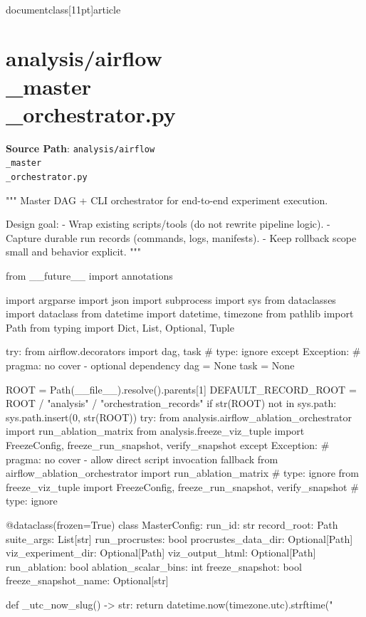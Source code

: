 \\documentclass[11pt]{article}
\begin{document}
\section*{analysis/airflow\\_master\\_orchestrator.py}
\textbf{Source Path}: \texttt{analysis/airflow\\_master\\_orchestrator.py}\par
\bigskip
\begin{CodeBlock}
"""
Master DAG + CLI orchestrator for end-to-end experiment execution.

Design goal:
- Wrap existing scripts/tools (do not rewrite pipeline logic).
- Capture durable run records (commands, logs, manifests).
- Keep rollback scope small and behavior explicit.
"""

from __future__ import annotations

import argparse
import json
import subprocess
import sys
from dataclasses import dataclass
from datetime import datetime, timezone
from pathlib import Path
from typing import Dict, List, Optional, Tuple

try:
    from airflow.decorators import dag, task  # type: ignore
except Exception:  # pragma: no cover - optional dependency
    dag = None
    task = None


ROOT = Path(__file__).resolve().parents[1]
DEFAULT_RECORD_ROOT = ROOT / "analysis" / "orchestration_records"
if str(ROOT) not in sys.path:
    sys.path.insert(0, str(ROOT))
try:
    from analysis.airflow_ablation_orchestrator import run_ablation_matrix
    from analysis.freeze_viz_tuple import FreezeConfig, freeze_run_snapshot, verify_snapshot
except Exception:  # pragma: no cover - allow direct script invocation fallback
    from airflow_ablation_orchestrator import run_ablation_matrix  # type: ignore
    from freeze_viz_tuple import FreezeConfig, freeze_run_snapshot, verify_snapshot  # type: ignore


@dataclass(frozen=True)
class MasterConfig:
    run_id: str
    record_root: Path
    suite_args: List[str]
    run_procrustes: bool
    procrustes_data_dir: Optional[Path]
    viz_experiment_dir: Optional[Path]
    viz_output_html: Optional[Path]
    run_ablation: bool
    ablation_scalar_bins: int
    freeze_snapshot: bool
    freeze_snapshot_name: Optional[str]


def _utc_now_slug() -> str:
    return datetime.now(timezone.utc).strftime("%



\end{CodeBlock}
\end{document}
